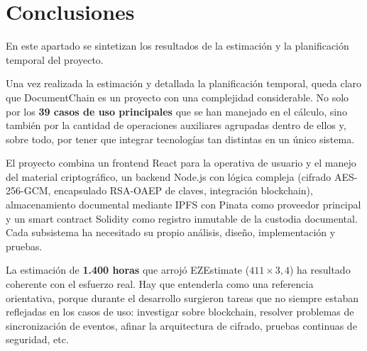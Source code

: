 \documentclass[11pt, a4paper]{article}
\begin{document}
\section{Conclusiones}

En este apartado se sintetizan los resultados de la estimación y la planificación temporal del proyecto.

Una vez realizada la estimación y detallada la planificación temporal, queda claro que DocumentChain es un proyecto con una complejidad considerable. No solo por los \textbf{39 casos de uso principales} que se han manejado en el cálculo, sino también por la cantidad de operaciones auxiliares agrupadas dentro de ellos y, sobre todo, por tener que integrar tecnologías tan distintas en un único sistema.

El proyecto combina un frontend React para la operativa de usuario y el manejo del material criptográfico, un backend Node.js con lógica compleja (cifrado AES-256-GCM, encapsulado RSA-OAEP de claves, integración blockchain), almacenamiento documental mediante IPFS con Pinata como proveedor principal y un smart contract Solidity como registro inmutable de la custodia documental. Cada subsistema ha necesitado su propio análisis, diseño, implementación y pruebas.

La estimación de \textbf{1.400 horas} que arrojó EZEstimate ($411 \times 3{,}4$) ha resultado coherente con el esfuerzo real. Hay que entenderla como una referencia orientativa, porque durante el desarrollo surgieron tareas que no siempre estaban reflejadas en los casos de uso: investigar sobre blockchain, resolver problemas de sincronización de eventos, afinar la arquitectura de cifrado, pruebas continuas de seguridad, etc.
\end{document}
